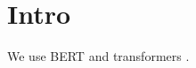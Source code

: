 \documentclass{article}
\begin{document}
\section{Intro}
We use BERT \cite{} and transformers \citep{TODO}.
\end{document}
